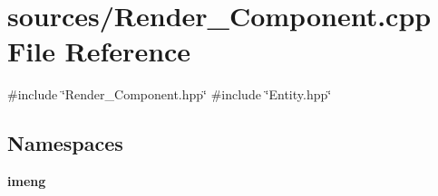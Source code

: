 \section{sources/\+Render\+\_\+\+Component.cpp File Reference}
\label{_render___component_8cpp}
{\ttfamily \#include \char`\"{}Render\+\_\+\+Component.\+hpp\char`\"{}}\newline
{\ttfamily \#include \char`\"{}Entity.\+hpp\char`\"{}}\newline
\subsection*{Namespaces}
\begin{DoxyCompactItemize}
\item 
 \textbf{ imeng}
\end{DoxyCompactItemize}
